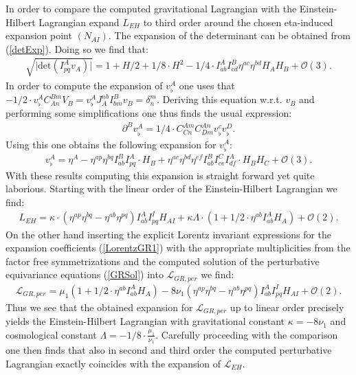 \documentclass[a4paper,12pt, DIV=14, BCOR=5mm, twoside, headsepline, numbers=noenddot]{scrbook}
\begin{document}
In order to compare the computed gravitational Lagrangian with the Einstein-Hilbert Lagrangian expand $L_{EH}$ to third order around the chosen eta-induced expansion point $(N_{AI})$. The expansion of the determinant can be obtained from (\ref{detExp}). Doing so we find that:
\begin{align}
   \sqrt{\vert \mathrm{det} \left ( I^A_{pq}v_A \right ) \vert } = 1 + H/2 +1/8 \cdot H^2 - 1/4 \cdot I^A_{ab}I^B_{cd} \eta^{ac} \eta^{bd} H_A H_B + \mathcal{O}(3).   
\end{align}
In order to compute the expansion of $v^A_{\flat}$ one uses that $-1/2 \cdot v_{\flat}^AC_{An}^{Bm}V_B = v_{\flat}^A J_A^{nb}I^B_{bm}v_B = \delta^m_n$. Deriving this equation w.r.t. $v_B$ and performing some simplifications one thus finds the usual expression:
\begin{align}
    \partial^Bv_{\flat}^A = 1/4 \cdot C_{Cn}^{Am}C_{Dm}^{An}v_{\flat}^c v_{\flat}^{D}.
\end{align}
Using this one obtains the following expansion for $v_{\flat}^A$:
\begin{align}
    v_{\flat}^A = \eta^A - \eta^{ap}\eta^{bq} I^B_{ab} I^A_{pq} \cdot H_B + \eta^{ac}\eta^{bd}\eta^{ef} I^B_{ab} I^C_{ce} I^A_{df} \cdot H_BH_C + \mathcal{O}(3).  
\end{align}
With these results computing this expansion is straight forward yet quite laborious.
Starting with the linear order of the Einstein-Hilbert Lagrangian we find:
\begin{align}
        L_{EH} = \kappa \cdot (\eta^{ap}\eta^{bq} - \eta^{ab}\eta^{pq}) I^{A}_{ab}I^{I}_{pq} H_{AI} + \kappa \Lambda \cdot (1 + 1/2 \cdot \eta^{ab} I_{ab}^A H_A) + \mathcal{O}(2).
\end{align}
On the other hand inserting the explicit Lorentz invariant expressions for the expansion coefficients (\ref{LorentzGR1}) with the appropriate multiplicities from the factor free symmetrizations and the computed solution of the perturbative equivariance equations (\ref{GRSol}) into $\mathcal{L}_{GR,per}$ we find:
\begin{align}
    \mathcal{L}_{GR,per} = \mu_1(1 + 1/2 \cdot \eta^{ab} I_{ab}^A H_A) - 8 \nu_1 \left(\eta^{ap}\eta^{bq} - \eta^{ab}\eta^{pq} \right )I^{A}_{ab}I^{I}_{pq} H_{AI} + \mathcal{O}(2).
\end{align}
Thus we see that the obtained expansion for $\mathcal{L}_{GR,per}$ up to linear order precisely yields the Einstein-Hilbert Lagrangian with gravitational constant $\kappa = -8 \nu_1$ and cosmological constant $\Lambda = -1/8 \cdot \frac{\mu_1}{\nu_1}$. Carefully proceeding with the comparison one then finds that also in second and third order the computed perturbative Lagrangian exactly coincides with the expansion of $\mathcal{L}_{EH}$.  
\end{document}

